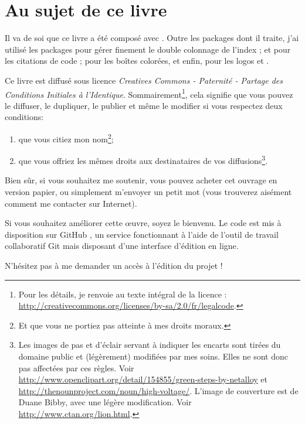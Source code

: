 \section*{Au sujet de ce livre}

Il va de soi que ce livre a été composé avec \XeLaTeX. Outre les packages dont il traite, j'ai utilisé les packages  pour gérer finement le double colonnage de l'index ;  et  pour les citations de code ;  pour les boîtes colorées, et enfin,  pour les logos \XeLaTeX et \XeTeX.



Ce livre est diffusé sous licence \emph{Creatives Commons - Paternité - Partage des Conditions Initiales à l'Identique}. Sommairement\footnote{Pour les détails, je renvoie au texte intégral de la licence : \url{http://creativecommons.org/licenses/by-sa/2.0/fr/legalcode}.}, cela signifie que vous pouvez le diffuser, le dupliquer, le publier et même le modifier si vous respectez deux conditions:
\begin{enumerate}
\item que vous citiez mon nom\footnote{Et que vous ne portiez  pas atteinte à mes droits moraux.};
\item que vous offriez les mêmes droits aux destinataires de vos diffusions\footnote{Les images de pas et d'éclair servant à indiquer les encarts sont tirées du domaine public et (légèrement) modifiées par mes soins. Elles ne sont donc pas affectées par ces règles. Voir \url{http://www.openclipart.org/detail/154855/green-steps-by-netalloy} et \url{http://thenounproject.com/noun/high-voltage/}. L'image de couverture est de Duane  Bibby, avec une légère modification. Voir \url{http://www.ctan.org/lion.html}.}.
\end{enumerate}

Bien sûr, si vous souhaitez me soutenir, vous pouvez acheter cet ouvrage en version papier, ou simplement m'envoyer un petit mot (vous trouverez aisément comment me contacter sur Internet).

Si vous souhaitez améliorer cette œuvre, soyez le bienvenu. Le code est mis à disposition sur GitHub \url{}, un service fonctionnant à l'aide de l'outil de travail collaboratif Git mais disposant d'une interface d'édition en ligne. 

N'hésitez pas à me demander un accès à l'édition du projet ! 

